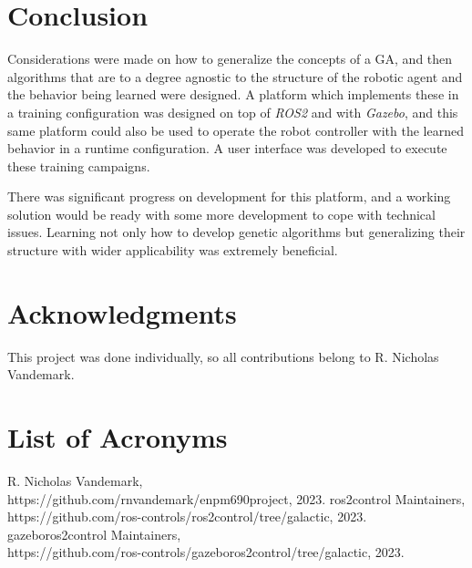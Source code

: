 \documentclass[conference]{IEEEtran}
\begin{document}
	\section{Conclusion}

	Considerations were made on how to generalize the concepts of a \ac{GA}, and then algorithms that are to a degree agnostic to the structure of the robotic agent and the behavior being learned were designed. A platform which implements these in a training configuration was designed on top of \textit{ROS2} and with \textit{Gazebo}, and this same platform could also be used to operate the robot controller with the learned behavior in a runtime configuration. A user interface was developed to execute these training campaigns.

	There was significant progress on development for this platform, and a working solution would be ready with some more development to cope with technical issues. Learning not only how to develop genetic algorithms but generalizing their structure with wider applicability was extremely beneficial.

	\section{Acknowledgments}

	This project was done individually, so all contributions belong to R. Nicholas Vandemark.

	\section{List of Acronyms}

	\begin{acronym}
	\end{acronym}
	
	\begin{thebibliography}{00}
		 R. Nicholas Vandemark,\\
		https://github.com/rnvandemark/enpm690\textunderscore project, 2023.
		 ros2\textunderscore control Maintainers,\\
		https://github.com/ros-controls/ros2\textunderscore control/tree/galactic, 2023.
		 gazebo\textunderscore ros2\textunderscore control Maintainers,\\
		https://github.com/ros-controls/gazebo\textunderscore ros2\textunderscore control/tree/galactic, 2023.
	\end{thebibliography}
	
\end{document}
